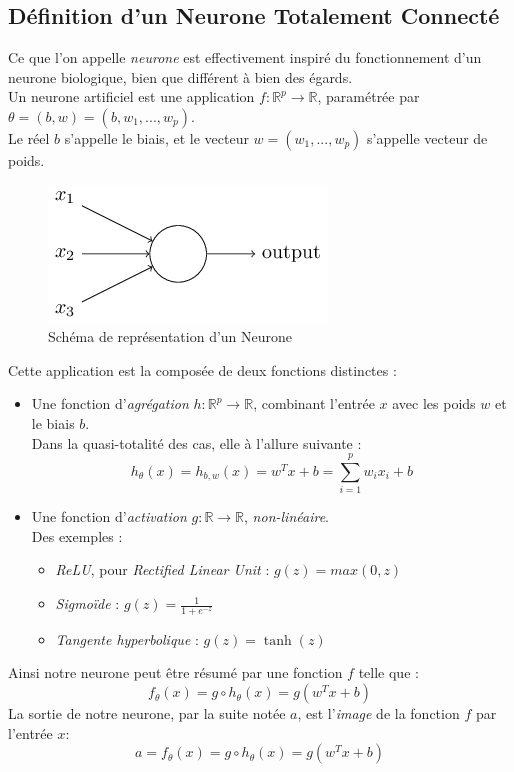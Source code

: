 \documentclass[10pt,a4paper]{report}
\begin{document}
		\subsection{Définition d'un Neurone Totalement Connecté}
		Ce que l'on appelle \emph{neurone} est effectivement inspiré du fonctionnement d'un neurone biologique, bien que différent à bien des égards.\\
			Un neurone artificiel est une application $f : \mathbb{R}^p \rightarrow \mathbb{R}$, paramétrée par $\theta = (b,w) = (b, w_1, ..., w_p)$.\\
			Le réel $b$ s'appelle le biais, et le vecteur $w = (w_1, ..., w_p)$ s'appelle vecteur de poids.
			\begin{figure}[H]
				\begin{center}
					\includegraphics[scale=0.5]{Images/neuron.png}
					\caption{Schéma de représentation d'un Neurone}
				\end{center}
			\end{figure}
			Cette application est la composée de deux fonctions distinctes :
			\begin{itemize}
				\item Une fonction d’\emph{agrégation} $h : \mathbb{R}^p \rightarrow \mathbb{R}$, combinant l'entrée $x$ avec les poids $w$ et le biais $b$.\\
				Dans la quasi-totalité des cas, elle à l'allure suivante :
				$$h_\theta(x) = h_{b,w}(x) = w^Tx + b = \sum_{i=1}^{p}{w_i x_i} + b$$
				\item Une fonction d'\emph{activation} $g : \mathbb{R} \rightarrow \mathbb{R}$, \emph{non-linéaire}.\\
				Des exemples :
				\begin{itemize}
					\item \emph{ReLU}, pour \emph{Rectified Linear Unit} : $g(z) = max(0,z)$
					\item \emph{Sigmoïde} : $g(z) = \frac{1}{1+e^{-z}}$
					\item \emph{Tangente hyperbolique} : $g(z) = \tanh(z)$
				\end{itemize}
			\end{itemize}
		Ainsi notre neurone peut être résumé par une fonction $f$ telle que :
		$$f_\theta(x) = g \circ h_\theta(x) = g(w^Tx + b)$$
		La sortie de notre neurone, par la suite notée $a$, est l'\emph{image} de la fonction $f$ par l'entrée $x$:
		$$a = f_\theta(x) = g \circ h_\theta(x) = g(w^Tx + b)$$
\end{document}
